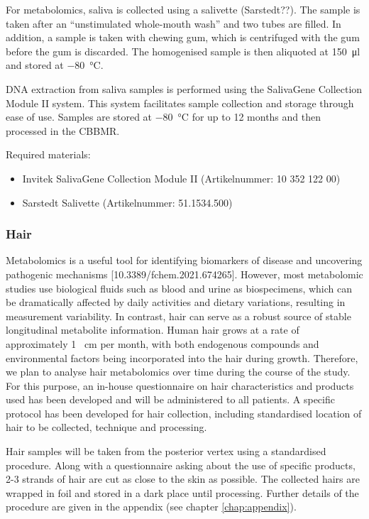 For metabolomics, saliva is collected using a salivette (Sarstedt??). The sample is taken after an ``unstimulated whole-mouth wash'' and two tubes are filled. In addition, a sample is taken with chewing gum, which is centrifuged with the gum before the gum is discarded.  The homogenised sample is then aliquoted at \SI[round-precision = 0, round-mode = places]{150}{\micro\litre} and stored at \SI[round-precision = 0, round-mode = places]{-80}{\degreeCelsius}.

DNA extraction from saliva samples is performed using the SalivaGene Collection Module II system. This system facilitates sample collection and storage through ease of use. Samples are stored at \SI[round-precision = 0, round-mode = places]{-80}{\degreeCelsius} for up to \num[round-precision = 0, round-mode = places]{12} months and then processed in the \ac{CBBMR}.

Required materials:
\begin{itemize}
\item Invitek SalivaGene Collection Module II (Artikelnummer: 10 352 122 00)
\item Sarstedt Salivette (Artikelnummer: 51.1534.500)
\end{itemize}

\subsubsection{Hair}
\label{biosamples:hair}
Metabolomics is a useful tool for identifying biomarkers of disease and uncovering pathogenic mechanisms [10.3389/fchem.2021.674265]. However, most metabolomic studies use biological fluids such as blood and urine as biospecimens, which can be dramatically affected by daily activities and dietary variations, resulting in measurement variability. In contrast, hair can serve as a robust source of stable longitudinal metabolite information. Human hair grows at a rate of approximately \num{1} \SI{}{\centi\metre} per month, with both endogenous compounds and environmental factors being incorporated into the hair during growth. Therefore, we plan to analyse hair metabolomics over time during the course of the study. For this purpose, an in-house questionnaire on hair characteristics and products used has been developed and will be administered to all patients. A specific protocol has been developed for hair collection, including standardised location of hair to be collected, technique and processing. 

Hair samples will be taken from the posterior vertex using a standardised procedure. Along with a questionnaire asking about the use of specific products, 2-3 strands of hair are cut as close to the skin as possible. The collected hairs are wrapped in foil and stored in a dark place until processing. Further details of the procedure are given in the appendix (see chapter \ref{chap:appendix}).

